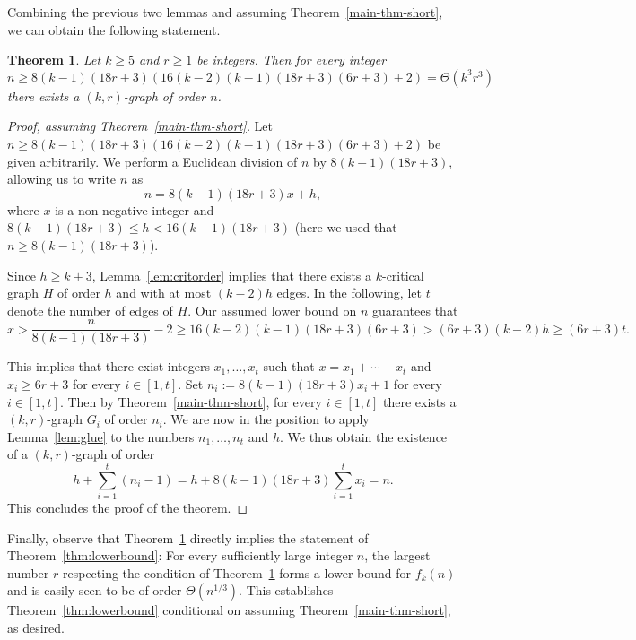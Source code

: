\documentclass[a4paper,10pt,hidelinks]{amsart}
\newtheorem{theorem}{Theorem}[section]
\theoremstyle{definition}
\begin{document}
Combining the previous two lemmas and assuming Theorem~\ref{main-thm-short}, we can obtain the following statement.

\begin{theorem}\label{thm:precise}
Let $k\ge 5$ and $r\ge 1$ be integers. Then for every integer $$n\ge 8(k-1)(18r+3)(16(k-2)(k-1)(18r+3)(6r+3)+2)=\Theta(k^3r^3)$$ there exists a $(k,r)$-graph of order $n$. 
\end{theorem}
\begin{proof}[Proof, assuming Theorem~\ref{main-thm-short}]
    Let $n\ge 8(k-1)(18r+3)(16(k-2)(k-1)(18r+3)(6r+3)+2)$ be given arbitrarily. We perform a Euclidean division of $n$ by $8(k-1)(18r+3)$, allowing us to write $n$ as 
    $$n=8(k-1)(18r+3)x+h,$$ where $x$ is a non-negative integer and $8(k-1)(18r+3)\le h<16(k-1)(18r+3)$ (here we used that $n\ge 8(k-1)(18r+3)$).

    Since $h\ge k+3$, Lemma~\ref{lem:critorder} implies that there exists a $k$-critical graph $H$ of order $h$ and with at most $(k-2)h$ edges. In the following, let $t$ denote the number of edges of $H$. Our assumed lower bound on $n$ guarantees that $$x>\frac{n}{8(k-1)(18r+3)}-2\ge 16(k-2)(k-1)(18r+3)(6r+3)> (6r+3)(k-2)h\ge (6r+3)t.$$

    This implies that there exist integers $x_1,\ldots,x_t$ such that $x=x_1+\cdots+x_t$ and $x_i\ge 6r+3$ for every $i\in [1,t]$. Set $n_i:=8(k-1)(18r+3)x_i+1$ for every $i\in [1,t]$. Then by Theorem~\ref{main-thm-short}, for every $i\in [1,t]$ there exists a $(k,r)$-graph $G_i$ of order $n_i$. We are now in the position to apply Lemma~\ref{lem:glue} to the numbers $n_1,\ldots,n_t$ and $h$. We thus obtain the existence of a $(k,r)$-graph of order
    $$h+\sum_{i=1}^{t}(n_i-1)=h+8(k-1)(18r+3)\sum_{i=1}^{t}x_i=n.$$ This concludes the proof of the theorem.
\end{proof}
Finally, observe that Theorem~\ref{thm:precise} directly implies the statement of Theorem~\ref{thm:lowerbound}: For every sufficiently large integer $n$, the largest number $r$ respecting the condition of Theorem~\ref{thm:precise} forms a lower bound for $f_k(n)$ and is easily seen to be of order $\Theta(n^{1/3})$. This establishes Theorem~\ref{thm:lowerbound} conditional on assuming Theorem~\ref{main-thm-short}, as desired.
\end{document}
